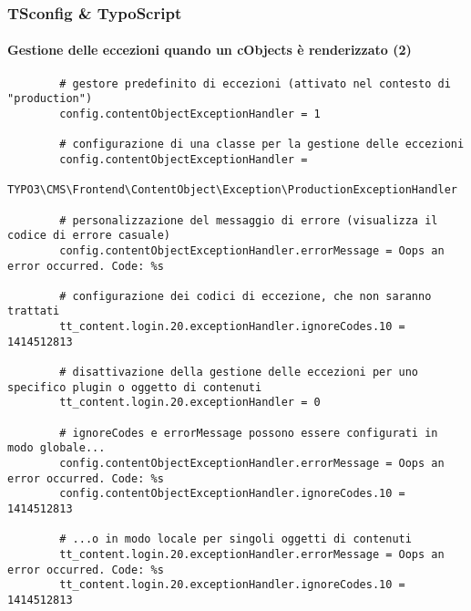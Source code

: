 \begin{frame}[fragile]
	\frametitle{TSconfig \& TypoScript}
	\framesubtitle{Gestione delle eccezioni quando un cObjects è renderizzato (2)}
	
	\lstset{
		basicstyle=\tiny\ttfamily
	}
	
	\begin{lstlisting}
		# gestore predefinito di eccezioni (attivato nel contesto di "production")
		config.contentObjectExceptionHandler = 1

		# configurazione di una classe per la gestione delle eccezioni
		config.contentObjectExceptionHandler =
		  TYPO3\CMS\Frontend\ContentObject\Exception\ProductionExceptionHandler

		# personalizzazione del messaggio di errore (visualizza il codice di errore casuale)
		config.contentObjectExceptionHandler.errorMessage = Oops an error occurred. Code: %s

		# configurazione dei codici di eccezione, che non saranno trattati
		tt_content.login.20.exceptionHandler.ignoreCodes.10 = 1414512813

		# disattivazione della gestione delle eccezioni per uno specifico plugin o oggetto di contenuti
		tt_content.login.20.exceptionHandler = 0

		# ignoreCodes e errorMessage possono essere configurati in modo globale...
		config.contentObjectExceptionHandler.errorMessage = Oops an error occurred. Code: %s
		config.contentObjectExceptionHandler.ignoreCodes.10 = 1414512813

		# ...o in modo locale per singoli oggetti di contenuti
		tt_content.login.20.exceptionHandler.errorMessage = Oops an error occurred. Code: %s
		tt_content.login.20.exceptionHandler.ignoreCodes.10 = 1414512813
	\end{lstlisting}

\end{frame}


